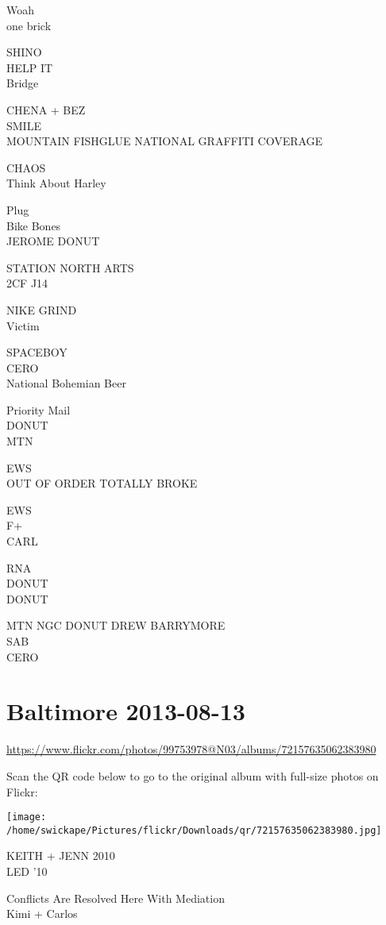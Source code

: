\documentclass[10pt,letterpaper]{article}
\begin{document}
Woah\\
one brick

SHINO\\
HELP IT\\
Bridge

CHENA + BEZ\\
SMILE\\
MOUNTAIN FISHGLUE NATIONAL GRAFFITI COVERAGE

CHAOS\\
Think About Harley

Plug\\
Bike Bones\\
JEROME DONUT

STATION NORTH ARTS\\
2CF J14

NIKE GRIND\\
Victim

SPACEBOY\\
CERO\\
National Bohemian Beer

Priority Mail\\
DONUT\\
MTN

EWS\\
OUT OF ORDER TOTALLY BROKE

EWS\\
F+\\
CARL

RNA\\
DONUT\\
DONUT

MTN NGC DONUT DREW BARRYMORE\\
SAB\\
CERO
\pagebreak

\section*{Baltimore 2013-08-13}

\url{https://www.flickr.com/photos/99753978@N03/albums/72157635062383980}

Scan the QR code below to go to the original album with full-size photos on Flickr:

\texttt{[image: /home/swickape/Pictures/flickr/Downloads/qr/72157635062383980.jpg]}
\pagebreak

KEITH + JENN 2010\\
LED '10

Conflicts Are Resolved Here With Mediation\\
Kimi + Carlos
\end{document}

